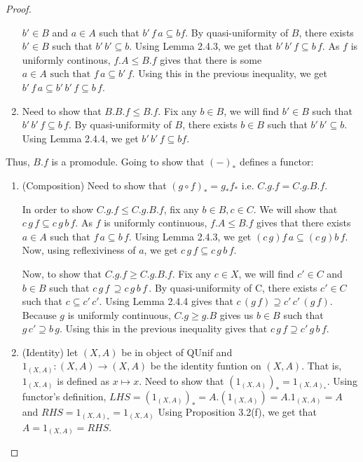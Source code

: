 \documentclass[18pt,a4paper]{article}
\theoremstyle{definition}
\begin{document}
\begin{proof}
\begin{enumerate}[label=(\roman*)]
			$b' \in B$ and $a\in A$ such that $b' \, f\,a \subseteq bf$.
			By quasi-uniformity of $B$, there exists $b' \in B$ such that $b'\,b'
			\subseteq b$. Using Lemma 2.4.3, we get that $b'\,b'\,f \subseteq b\,f$.
			As $f$ is uniformly continous, $f.A \leq B.f$ gives that there is some
			$a \in A \text{ such that } f\,a \subseteq b'\,f$. Using this in the
			previous inequality, we get $b'\,f\,a \subseteq b'\,b'\,f\subseteq  b\,f$.
		\item Need to show that $B.B.f \leq B.f$. Fix any $b \in B$, we will find
			$b' \in B$ such that $b'\,b'\,f \subseteq b\,f$.
			By quasi-uniformity of $B$, there exists $b \in B$ such that
			$b'\,b' \subseteq  b$. Using Lemma 2.4.4, we get $b'\,b'\,f \subseteq bf$.
	\end{enumerate}
	Thus, $B.f$ is a promodule. Going to show that $(-)_*$ defines a functor:
	\begin{enumerate}[label=(\roman*)]
		\item (Composition) Need to show that $(g\circ f)_*=g_*f_*$ i.e. $C.g.f=C.g.B.f$.

	In order to show $C.g.f \leq C.g.B.f$, fix any $b\in B, c\in C$.
			We will show that $c\,g\,f \subseteq c\,g\,b\,f$. As $f$ is uniformly
			continuous, $f.A \leq B.f$ gives that there exists $a \in A$ such that
			$f\,a \subseteq b\,f$. Using Lemma 2.4.3, we get $(c\,g)f\,a \subseteq
			(c\,g)b\,f$. Now, using reflexiviness of $a$, we get $c\,g\,f \subseteq
			c\,g\,b\,f$.

			Now, to show that $C.g.f \geq C.g.B.f$. Fix any $c \in X$, we will find $c' \in C$ and
			$b \in B$ such that $c\, g\, f\, \supseteq c\, g\, b\, f\, $. By quasi-uniformity of C,
			there exists $c' \in C$ such that $c \subseteq  c'\, c'$. Using Lemma 2.4.4
			gives that $c\, (g\, f)\supseteq c'\, c'\, (g\, f) $. Because $g$ is uniformly
			continuous, $C.g \geq g.B$ gives us $b\in B$ such that $g\, c' \supseteq b\, g$.
			Using this in the previous inequality gives that $c\, g\, f \supseteq c'\, g\, b\, f$.

			\item(Identity) let $(X,A)$ be in object of QUnif and
				$1_{(X,A)}:(X,A)\to(X,A)$ be the identity funtion on $(X,A)$. That is,
				$1_{(X,A)}$ is defined as $x\mapsto x$.
				Need to show that $(1_{(X,A)})_*=1_{(X,A)_*}$. Using
				functor's definition, $LHS=(1_{(X,A)})_*=A.(1_{(X,A)})=A.1_{(X,A)}=A$
				and $RHS=1_{(X,A)_*}=1_{(X,A)}$
				Using Proposition 3.2(f), we get that $A=1_{(X,A)}=RHS$.
		\end{enumerate}
\end{proof}
\end{document}
